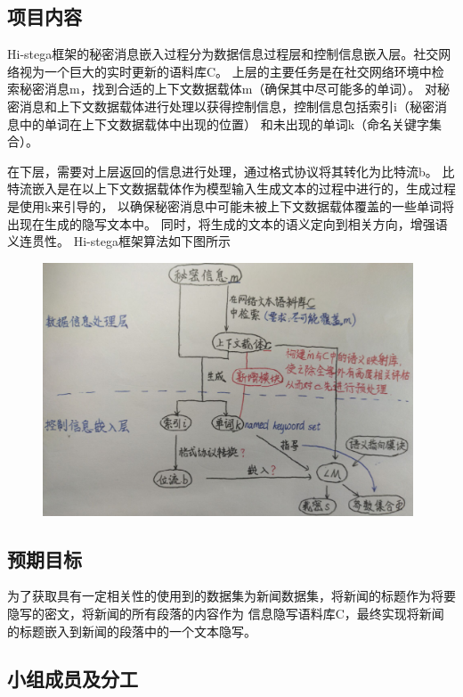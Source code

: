 \documentclass[a4paper,11pt,UTF8]{ctexart}
\newcommand{\bottomcaption}{%
\setlength{\abovecaptionskip}{6pt}%
\setlength{\belowcaptionskip}{6pt}%
\caption}
\newcommand{\xiaowuhao}{\fontsize{9pt}{\baselineskip}\selectfont}   %
\begin{document}
    \subsection{项目内容}
      Hi-stega框架\cite{ref1}的秘密消息嵌入过程分为数据信息过程层和控制信息嵌入层。社交网络视为一个巨大的实时更新的语料库C。
      上层的主要任务是在社交网络环境中检索秘密消息m，找到合适的上下文数据载体m（确保其中尽可能多的单词）。
      对秘密消息和上下文数据载体进行处理以获得控制信息，控制信息包括索引i（秘密消息中的单词在上下文数据载体中出现的位置）
      和未出现的单词k（命名关键字集合）。\par
      在下层，需要对上层返回的信息进行处理，通过格式协议将其转化为比特流b。
      比特流嵌入是在以上下文数据载体作为模型输入生成文本的过程中进行的，生成过程是使用k来引导的，
      以确保秘密消息中可能未被上下文数据载体覆盖的一些单词将出现在生成的隐写文本中。
      同时，将生成的文本的语义定向到相关方向，增强语义连贯性。
      Hi-stega框架算法如下图所示
      \begin{figure}[H]
          \centering
          \includegraphics[width=11cm]{Hi-stega框架.png}
          \bottomcaption{\xiaowuhao{Hi-stega框架}}
      \end{figure}

    \subsection{预期目标}
      为了获取具有一定相关性的使用到的数据集为新闻数据集，将新闻的标题作为将要隐写的密文，将新闻的所有段落的内容作为
      信息隐写语料库C，最终实现将新闻的标题嵌入到新闻的段落中的一个文本隐写。
      
    \subsection{小组成员及分工}
\end{document}
